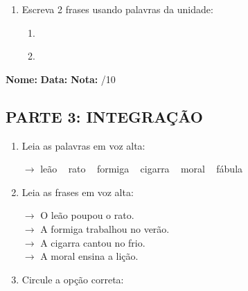 \begin{exercicio}
\begin{enumerate}[resume]
  \item Escreva 2 frases usando palavras da unidade:
  \begin{enumerate}[label=\alph*)]
    \item \underline{\hspace{8cm}}
    \item \underline{\hspace{8cm}}
  \end{enumerate}

\end{enumerate}

\end{exercicio}



\begin{exercicio}

\noindent\textbf{Nome:} \underline{\hspace{3.2cm}} \quad \textbf{Data:} \underline{\hspace{1.6cm}} \quad \textbf{Nota:} \underline{\hspace{0.9cm}}/10


\subsection*{PARTE 3: INTEGRAÇÃO}

\begin{enumerate}[resume]

  \item Leia as palavras em voz alta:
  \begin{center}
  $\rightarrow$ leão ~ rato ~ formiga ~ cigarra ~ moral ~ fábula
  \end{center}

  \item Leia as frases em voz alta:
  \begin{center}
  $\rightarrow$ O leão poupou o rato.\\
  $\rightarrow$ A formiga trabalhou no verão.\\
  $\rightarrow$ A cigarra cantou no frio.\\
  $\rightarrow$ A moral ensina a lição.\\
  \end{center}

  \item Circule a opção correta:
  \begin{enumerate}[label=(\alph*)]


\end{enumerate}
\end{enumerate}
\end{exercicio}
